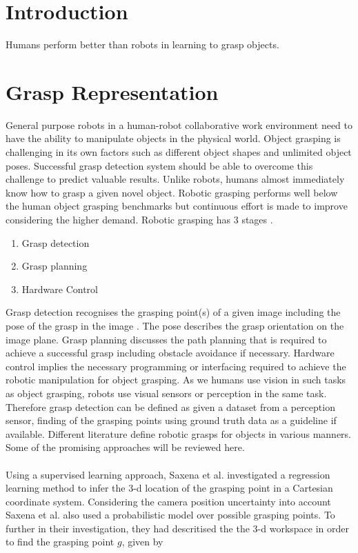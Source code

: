 \documentclass{vldb}
\begin{document}
\section{Introduction}
Humans perform better than robots in learning to grasp objects. 

\section{Grasp Representation}
General purpose robots in a human-robot collaborative work environment need to have the ability to manipulate objects in the physical world. Object grasping is challenging in its own factors such as different object shapes and unlimited object poses. Successful grasp detection system should be able to overcome this challenge to predict valuable results. Unlike robots, humans almost immediately know how to grasp a given novel object. Robotic grasping performs well below the human object grasping benchmarks but continuous effort is made to improve considering the higher demand. Robotic grasping has 3 stages \cite{sulabh}.
\begin{enumerate}
    \item Grasp detection
    \item Grasp planning
    \item Hardware Control
\end{enumerate}
Grasp detection recognises the grasping point(s) of a given image including the pose of the grasp in the image \cite{mahler}. The pose describes the grasp orientation on the image plane. Grasp planning discusses the path planning that is required to achieve a successful grasp including obstacle avoidance if necessary. Hardware control implies the necessary programming or interfacing required to achieve the robotic manipulation for object grasping. As we humans use vision in such tasks as object grasping, robots use visual sensors or perception in the same task. Therefore grasp detection can be defined as given a dataset from a perception sensor, finding of the grasping points using ground truth data as a guideline if available. Different literature define robotic grasps for objects in various manners. Some of the promising approaches will be reviewed here.
\\ \\
Using a supervised learning approach, Saxena et al. \cite{saxena_2006} investigated a regression learning method to infer the 3-d location of the grasping point in a Cartesian coordinate system. Considering the camera position uncertainty into account Saxena et al. \cite{saxena_2006} also used a probabilistic model over possible grasping points. To further in their investigation, they had descritised the the 3-d workspace in order to find the grasping point $g$, given by
\end{document}

